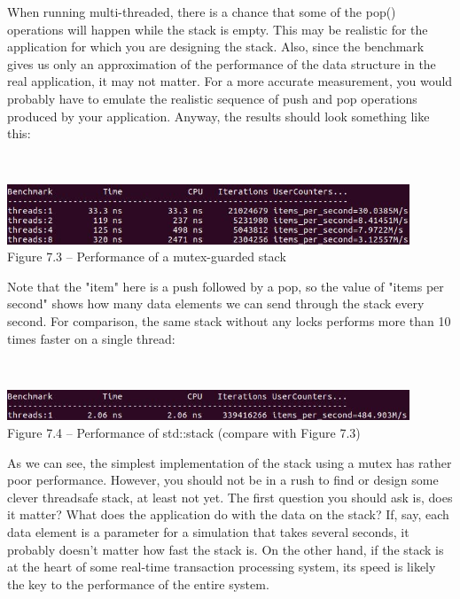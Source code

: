When running multi-threaded, there is a chance that some of the pop() operations will happen while the stack is empty. This may be realistic for the application for which you are designing the stack. Also, since the benchmark gives us only an approximation of the performance of the data structure in the real application, it may not matter. For a more accurate measurement, you would probably have to emulate the realistic sequence of push and pop operations produced by your application. Anyway, the results should look something like this:

\hspace*{\fill} \\ %
\begin{center}
\includegraphics[width=0.9\textwidth]{content/2/chapter7/images/3.jpg}\\
Figure 7.3 – Performance of a mutex-guarded stack
\end{center}

Note that the "item" here is a push followed by a pop, so the value of "items per second" shows how many data elements we can send through the stack every second. For comparison, the same stack without any locks performs more than 10 times faster on a single thread:

\hspace*{\fill} \\ %
\begin{center}
\includegraphics[width=0.9\textwidth]{content/2/chapter7/images/4.jpg}\\
Figure 7.4 – Performance of std::stack (compare with Figure 7.3)
\end{center}

As we can see, the simplest implementation of the stack using a mutex has rather poor performance. However, you should not be in a rush to find or design some clever threadsafe stack, at least not yet. The first question you should ask is, does it matter? What does the application do with the data on the stack? If, say, each data element is a parameter for a simulation that takes several seconds, it probably doesn't matter how fast the stack is. On the other hand, if the stack is at the heart of some real-time transaction processing system, its speed is likely the key to the performance of the entire system.

